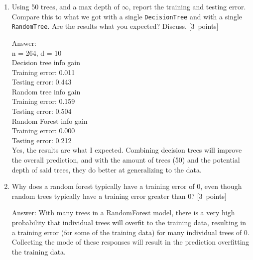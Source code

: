 \documentclass{article}
\newcommand{\blu}[1]{{\textcolor{blu}{#1}}}
\newenvironment{answer}{\par\begingroup\color{gre}Answer: }{\endgroup}
\let\ask\blu
\newcommand\pts[1]{\textcolor{pointscolour}{[#1~points]}}
\begin{document}
\begin{enumerate}
\begin{answer}
\begin{verbatim}
            def predict(self, X_pred):
                n, d = X_pred.shape
                y = np.zeros(n)

                # Get predictions
                y_hat_trees = np.empty((n, self.num_trees))
                for t in range(self.num_trees):
                    predictions = self.models[t].predict(X_pred)
                    y_hat_trees[:, t] = predictions

                # Find mode of predictions, add to y
                for x in range(n):
                    pred_array = y_hat_trees[x]
                    y[x] = utils.mode(pred_array)

                return y
        \end{verbatim}
        \end{answer}
        \item Using 50 trees, and a max depth of $\infty$, \ask{report the training and testing error}. Compare this to what we got with a single \texttt{DecisionTree} and with a single \texttt{RandomTree}. \ask{Are the results what you expected? Discuss.} \pts{3}
        \begin{answer} \\
        n = 264, d = 10 \\
        Decision tree info gain \\
            Training error: 0.011 \\
            Testing error: 0.443  \\
        Random tree info gain \\
            Training error: 0.159 \\
            Testing error: 0.504 \\
        Random Forest info gain \\
            Training error: 0.000 \\
            Testing error: 0.212 \\

        Yes, the results are what I expected. Combining decision trees will improve the overall prediction, and with the amount of trees (50) and the potential depth of said trees, they do better at generalizing to the data. 
        \end{answer}
        \item \ask{Why does a random forest typically have a training error of 0, even though random trees typically have a training error greater than 0?} \pts{3}
        \begin{answer}
        With many trees in a RandomForest model, there is a very high probability that individual trees will overfit to the training data, resulting in a training error (for some of the training data) for many individual trees of 0. Collecting the mode of these responses will result in the prediction overfitting the training data.
        \end{answer}
    \end{enumerate}
\end{document}
